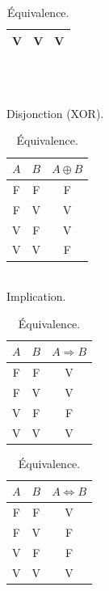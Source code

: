 \documentclass[a4paper, 12pt]{article}
\newcommand{\ffi}{\Leftrightarrow}
\newcommand{\imply}{\Rightarrow}
\numberwithin{equation}{subsection}
\begin{document}
\begin{table}[H]
\begin{minipage}[c]{0.27\linewidth}
\begin{tabular}{|c|c|c|}
                V  &  V  &      V      \\
        \hline
    \end{tabular}
  \end{minipage}
  \\[1.0cm]
  \begin{minipage}[c]{0.27\linewidth}
    \centering
    \caption{\\Disjonction (XOR).}
    \label{xor_table}
      \begin{tabular}{|c|c|c|}
        \hline $A$ & $B$ & $A \oplus B$ \\
        \hline  F  &  F  &       F      \\
                F  &  V  &       V      \\
                V  &  F  &       V      \\
                V  &  V  &       F      \\
        \hline
      \end{tabular}
    \end{minipage}
    \hspace{1.0cm}
    \begin{minipage}[c]{0.22\linewidth}
      \centering
      \caption{\\Implication.}
      \label{imply_table}
      \begin{tabular}{|c|c|c|}
        \hline $A$ & $B$ & $A \imply B$ \\
        \hline  F  &  F  &       V        \\
                F  &  V  &       V        \\
                V  &  F  &       F        \\
                V  &  V  &       V        \\
        \hline
      \end{tabular}
    \end{minipage}
    \hspace{1.0cm}
    \begin{minipage}[c]{0.1\linewidth}
      \centering
      \caption{Équivalence.}
      \label{iff_table}
      \begin{tabular}{|c|c|c|}
        \hline $A$ & $B$ & $A \ffi B$ \\
        \hline  F  &  F  &      V     \\
                F  &  V  &      F     \\
                V  &  F  &      F     \\
                V  &  V  &      V     \\
        \hline
      \end{tabular}
    \end{minipage}
  \end{table}
\end{document}
